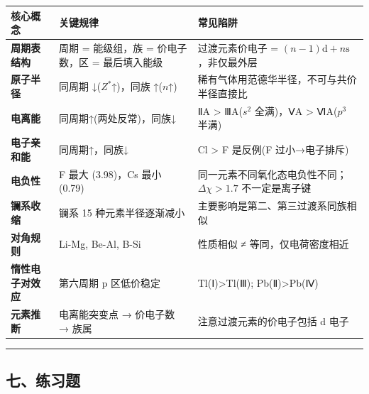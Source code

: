 {\def\LTcaptype{none} %
\begin{longtable}[]{@{}
  >{\raggedright\arraybackslash}p{}
  >{\raggedright\arraybackslash}p{}
  >{\raggedright\arraybackslash}p{}@{}}
\toprule\noalign{}
\begin{minipage}[b]{\linewidth}\raggedright
核心概念
\end{minipage} & \begin{minipage}[b]{\linewidth}\raggedright
关键规律
\end{minipage} & \begin{minipage}[b]{\linewidth}\raggedright
常见陷阱
\end{minipage} \\
\midrule\noalign{}
\endhead
\bottomrule\noalign{}
\endlastfoot
\textbf{周期表结构} & 周期 = 能级组，族 = 价电子数，区 = 最后填入能级 & 过渡元素价电子 = \((n-1)\mathrm{d} + n\mathrm{s}\)，非仅最外层 \\
\textbf{原子半径} & 同周期 ↓(\(Z^*\)↑)，同族 ↑(\(n\)↑) & 稀有气体用范德华半径，不可与共价半径直接比 \\
\textbf{电离能} & 同周期↑(两处反常)，同族↓ & ⅡA \textgreater{} ⅢA(\(s^2\) 全满)，ⅤA \textgreater{} ⅥA(\(p^3\) 半满) \\
\textbf{电子亲和能} & 同周期↑，同族↓ & Cl \textgreater{} F 是反例(F 过小→电子排斥) \\
\textbf{电负性} & F 最大 (3.98)，Cs 最小 (0.79) & 同一元素不同氧化态电负性不同；\(\Delta\chi>1.7\) 不一定是离子键 \\
\textbf{镧系收缩} & 镧系 15 种元素半径逐渐减小 & 主要影响是第二、第三过渡系同族相似 \\
\textbf{对角规则} & Li-Mg, Be-Al, B-Si & 性质相似 ≠ 等同，仅电荷密度相近 \\
\textbf{惰性电子对效应} & 第六周期 p 区低价稳定 & Tl(Ⅰ)\textgreater Tl(Ⅲ); Pb(Ⅱ)\textgreater Pb(Ⅳ) \\
\textbf{元素推断} & 电离能突变点 → 价电子数 → 族属 & 注意过渡元素的价电子包括 d 电子 \\
\end{longtable}
}

\begin{center}\rule{0.5\linewidth}{0.5pt}\end{center}

\subsection{七、练习题}\label{ux4e03ux7ec3ux4e60ux9898}

